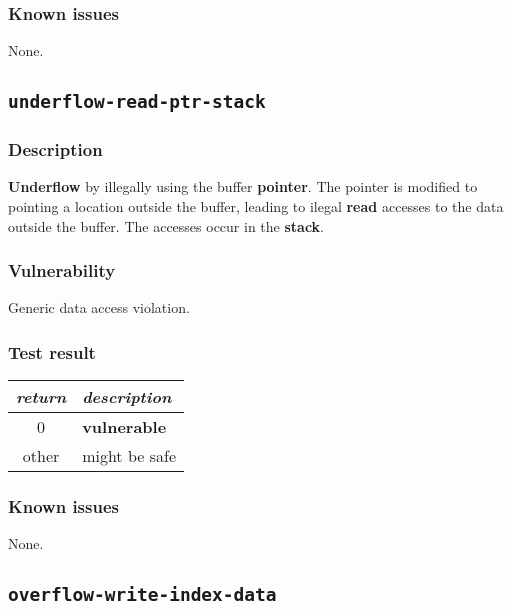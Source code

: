 \documentclass[a4paper]{book}
\begin{document}
\subsubsection{Known issues}

None.

\newpage

\subsection{\texttt{underflow-read-ptr-stack}}\label{test-underflow-read-ptr-stack}

\subsubsection{Description}

\textbf{Underflow} by illegally using the buffer \textbf{pointer}.
The pointer is modified to pointing a location outside the buffer,
leading to ilegal \textbf{read} accesses to the data outside the buffer.
The accesses occur in the \textbf{stack}.

\subsubsection{Vulnerability}
Generic data access violation.

\subsubsection{Test result}

\begin{tabular}{cl}
  \toprule
  \emph{return}  & \emph{description} \\
  \midrule
  0              & \textbf{vulnerable} \\
  other          & might be safe \\
  \bottomrule
\end{tabular}

\subsubsection{Known issues}

None.

\newpage

\subsection{\texttt{overflow-write-index-data}}\label{test-overflow-write-index-data}
\end{document}
